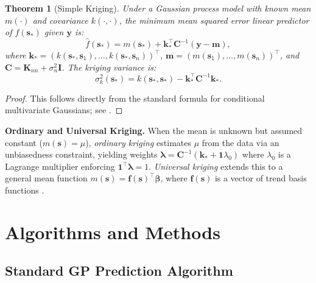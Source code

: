 \documentclass[conference]{IEEEtran}
\newtheorem{theorem}{Theorem}
\begin{document}
\begin{theorem}[Simple Kriging]
Under a Gaussian process model with known mean $m(\cdot)$ and covariance $k(\cdot,\cdot)$, the minimum mean squared error linear predictor of $f(\mathbf{s}_*)$ given $\mathbf{y}$ is:
\begin{equation}
  \hat{f}(\mathbf{s}_*) = m(\mathbf{s}_*) + \mathbf{k}_*^\top \mathbf{C}^{-1}(\mathbf{y} - \mathbf{m}),
  \label{eq:simple_kriging}
\end{equation}
where $\mathbf{k}_* = (k(\mathbf{s}_*, \mathbf{s}_1), \ldots, k(\mathbf{s}_*, \mathbf{s}_n))^\top$, $\mathbf{m} = (m(\mathbf{s}_1),\ldots,m(\mathbf{s}_n))^\top$, and $\mathbf{C} = \mathbf{K}_{nn} + \sigma_n^2\mathbf{I}$. The kriging variance is:
\begin{equation}
  \sigma^2_k(\mathbf{s}_*) = k(\mathbf{s}_*, \mathbf{s}_*) - \mathbf{k}_*^\top \mathbf{C}^{-1} \mathbf{k}_*.
  \label{eq:kriging_var}
\end{equation}
\end{theorem}

\begin{proof}
This follows directly from the standard formula for conditional multivariate Gaussians; see \cite{cressie1993statistics,rasmussen2006gaussian}.
\end{proof}

\textbf{Ordinary and Universal Kriging.} When the mean is unknown but assumed constant ($m(\mathbf{s}) = \mu$), \emph{ordinary kriging} estimates $\mu$ from the data via an unbiasedness constraint, yielding weights $\bm{\lambda} = \mathbf{C}^{-1}(\mathbf{k}_* + \mathbf{1}\lambda_0)$ where $\lambda_0$ is a Lagrange multiplier enforcing $\mathbf{1}^\top\bm{\lambda} = 1$. \emph{Universal kriging} extends this to a general mean function $m(\mathbf{s}) = \mathbf{f}(\mathbf{s})^\top\bm{\beta}$, where $\mathbf{f}(\mathbf{s})$ is a vector of trend basis functions \cite{cressie1993statistics}.

\section{Algorithms and Methods}
\label{sec:algorithms}

\subsection{Standard GP Prediction Algorithm}
\end{document}
